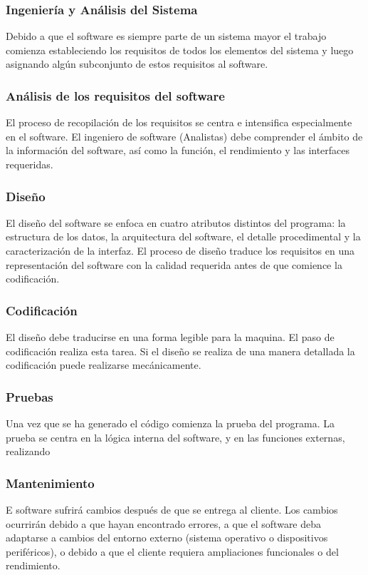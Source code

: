             \subsubsection{Ingeniería y Análisis del Sistema}
            Debido a que el software es siempre parte de un sistema mayor el trabajo comienza estableciendo los requisitos de todos los elementos del sistema y luego asignando algún subconjunto de estos requisitos al software.
            \subsubsection{Análisis de los requisitos del software}
            El proceso de recopilación de los requisitos se centra e intensifica especialmente en el software. El ingeniero de software (Analistas) debe comprender el ámbito de la información del software, así como la función, el rendimiento y las interfaces requeridas.
            \subsubsection{Diseño}
            El diseño del software se enfoca en cuatro atributos distintos del programa: la estructura de los datos, la arquitectura del software, el detalle procedimental y la caracterización de la interfaz. El proceso de diseño traduce los requisitos en una representación del software con la calidad requerida antes de que comience la codificación.
            \subsubsection{Codificación}
            El diseño debe traducirse en una forma legible para la maquina. El paso de codificación realiza esta tarea. Si el diseño se realiza de una manera detallada la codificación puede realizarse mecánicamente.
            \subsubsection{Pruebas}
            Una vez que se ha generado el código comienza la prueba del programa. La prueba se centra en la lógica interna del software, y en las funciones externas, realizando
            \subsubsection{Mantenimiento}
            E software sufrirá cambios después de que se entrega al cliente. Los cambios ocurrirán debido a que hayan encontrado errores, a que el software deba adaptarse a cambios del entorno externo (sistema operativo o dispositivos periféricos), o debido a que el cliente requiera ampliaciones funcionales o del rendimiento.

